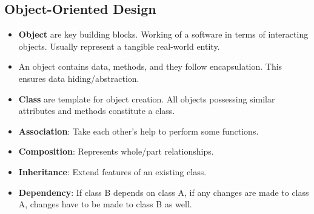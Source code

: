 \documentclass[a4paper]{article}
\begin{document}
\subsection{Object-Oriented Design}
\begin{itemize}
    \item \textbf{Object} are key building blocks. Working of a software in terms of interacting objects. Usually represent a tangible real-world entity.
    \item An object contains data, methods, and they follow encapsulation. This ensures data hiding/abstraction.
    \item \textbf{Class} are template for object creation. All objects possessing similar attributes and methods constitute a class.
    \item \textbf{Association}: Take each other's help to perform some functions.
    \item \textbf{Composition}: Represents whole/part relationships.
    \item \textbf{Inheritance}: Extend features of an existing class.
    \item \textbf{Dependency}: If class B depends on class A, if any changes are made to class A, changes have to be made to class B as well.
\end{itemize}
\end{document}
